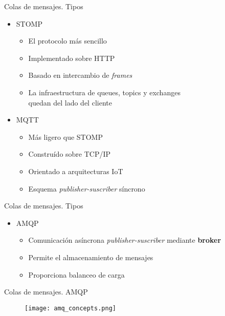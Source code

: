 \documentclass{beamer}
\begin{document}
  \begin{frame}{Colas de mensajes. Tipos}
    \begin{itemize}
      \item STOMP
      \begin{itemize}
        \item El protocolo más sencillo
        \item Implementado sobre HTTP
        \item Basado en intercambio de \textit{frames}
        \item La infraestructura de queues, topics y exchanges\\
        quedan del lado del cliente
      \end{itemize}
      \item MQTT
      \begin{itemize}
        \item Más ligero que STOMP
        \item Construído sobre TCP/IP
        \item Orientado a arquitecturas IoT
        \item Esquema \textit{publisher-suscriber} síncrono
      \end{itemize}
    \end{itemize}
  \end{frame}

  \begin{frame}{Colas de mensajes. Tipos}
    \begin{itemize}
      \item AMQP
      \begin{itemize}
        \item Comunicación asíncrona \textit{publisher-suscriber} mediante \textbf{broker}
        \item Permite el almacenamiento de mensajes
        \item Proporciona balanceo de carga
      \end{itemize}
    \end{itemize}
  \end{frame}

  \begin{frame}{Colas de mensajes. AMQP}
    \begin{figure}
      \texttt{[image: amq\_concepts.png]}
    \end{figure}
  \end{frame}
\end{document}

